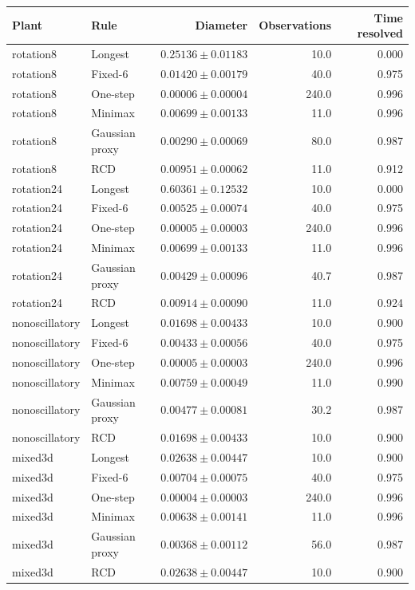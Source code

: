 \begin{tabular}{llrrr}
\toprule
Plant & Rule & Diameter & Observations & Time resolved \\
\midrule
rotation8 & Longest & $0.25136\pm0.01183$ & 10.0 & 0.000 \\
rotation8 & Fixed-6 & $0.01420\pm0.00179$ & 40.0 & 0.975 \\
rotation8 & One-step & $0.00006\pm0.00004$ & 240.0 & 0.996 \\
rotation8 & Minimax & $0.00699\pm0.00133$ & 11.0 & 0.996 \\
rotation8 & Gaussian proxy & $0.00290\pm0.00069$ & 80.0 & 0.987 \\
rotation8 & RCD & $0.00951\pm0.00062$ & 11.0 & 0.912 \\
\midrule
rotation24 & Longest & $0.60361\pm0.12532$ & 10.0 & 0.000 \\
rotation24 & Fixed-6 & $0.00525\pm0.00074$ & 40.0 & 0.975 \\
rotation24 & One-step & $0.00005\pm0.00003$ & 240.0 & 0.996 \\
rotation24 & Minimax & $0.00699\pm0.00133$ & 11.0 & 0.996 \\
rotation24 & Gaussian proxy & $0.00429\pm0.00096$ & 40.7 & 0.987 \\
rotation24 & RCD & $0.00914\pm0.00090$ & 11.0 & 0.924 \\
\midrule
nonoscillatory & Longest & $0.01698\pm0.00433$ & 10.0 & 0.900 \\
nonoscillatory & Fixed-6 & $0.00433\pm0.00056$ & 40.0 & 0.975 \\
nonoscillatory & One-step & $0.00005\pm0.00003$ & 240.0 & 0.996 \\
nonoscillatory & Minimax & $0.00759\pm0.00049$ & 11.0 & 0.990 \\
nonoscillatory & Gaussian proxy & $0.00477\pm0.00081$ & 30.2 & 0.987 \\
nonoscillatory & RCD & $0.01698\pm0.00433$ & 10.0 & 0.900 \\
\midrule
mixed3d & Longest & $0.02638\pm0.00447$ & 10.0 & 0.900 \\
mixed3d & Fixed-6 & $0.00704\pm0.00075$ & 40.0 & 0.975 \\
mixed3d & One-step & $0.00004\pm0.00003$ & 240.0 & 0.996 \\
mixed3d & Minimax & $0.00638\pm0.00141$ & 11.0 & 0.996 \\
mixed3d & Gaussian proxy & $0.00368\pm0.00112$ & 56.0 & 0.987 \\
mixed3d & RCD & $0.02638\pm0.00447$ & 10.0 & 0.900 \\
\bottomrule
\end{tabular}